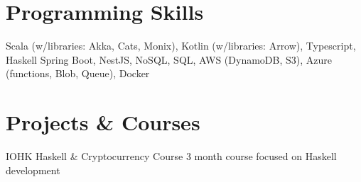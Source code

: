 \documentclass[letterpaper,11pt]{article}
\begin{document}
  \resumeSubHeadingListEnd


\section{Programming Skills}
 \resumeSubHeadingListStart
      {Scala (w/libraries: Akka, Cats, Monix), Kotlin (w/libraries: Arrow), Typescript, Haskell}
      {Spring Boot, NestJS, NoSQL, SQL, AWS (DynamoDB, S3), Azure (functions, Blob, Queue), Docker}
 \resumeSubHeadingListEnd


\section{Projects \& Courses}
  \resumeSubHeadingListStart
    \resumeSubItemWithDetails
      {IOHK Haskell \& Cryptocurrency Course}
      {3 month course focused on Haskell development}
  \resumeSubHeadingListEnd


\end{document}
